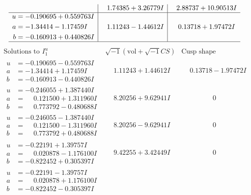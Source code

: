 \documentclass[1p]{elsarticle_modified}
\theoremstyle{definition}
\newcommand{\I}{\sqrt{-1}}
\begin{document}
$$\begin{array}{c|c|c}
 & \phantom{-}1.74385 + 3.26779 I & \phantom{-}2.88737 + 10.90513 I \\ \hline\begin{aligned}
u &= -0.190695 + 0.559763 I \\
a &= -1.34414 - 1.17459 I \\
b &= -0.160913 + 0.440826 I\end{aligned}
 & \phantom{-}1.11243 - 1.44612 I & \phantom{-}0.13718 + 1.97472 I\\
 \hline 
 \end{array}$$\newpage$$\begin{array}{c|c|c}  
\text{Solutions to }I^u_{1}& \I (\text{vol} + \sqrt{-1}CS) & \text{Cusp shape}\\
 \hline 
\begin{aligned}
u &= -0.190695 - 0.559763 I \\
a &= -1.34414 + 1.17459 I \\
b &= -0.160913 - 0.440826 I\end{aligned}
 & \phantom{-}1.11243 + 1.44612 I & \phantom{-}0.13718 - 1.97472 I \\ \hline\begin{aligned}
u &= -0.246055 + 1.387440 I \\
a &= \phantom{-}0.121500 + 1.311960 I \\
b &= \phantom{-}0.773792 - 0.480688 I\end{aligned}
 & \phantom{-}8.20256 + 9.62941 I & \phantom{-0.000000 } 0 \\ \hline\begin{aligned}
u &= -0.246055 - 1.387440 I \\
a &= \phantom{-}0.121500 - 1.311960 I \\
b &= \phantom{-}0.773792 + 0.480688 I\end{aligned}
 & \phantom{-}8.20256 - 9.62941 I & \phantom{-0.000000 } 0 \\ \hline\begin{aligned}
u &= -0.22191 + 1.39757 I \\
a &= \phantom{-}0.020878 - 1.176100 I \\
b &= -0.822452 + 0.305397 I\end{aligned}
 & \phantom{-}9.42255 + 3.42449 I & \phantom{-0.000000 } 0 \\ \hline\begin{aligned}
u &= -0.22191 - 1.39757 I \\
a &= \phantom{-}0.020878 + 1.176100 I \\
b &= -0.822452 - 0.305397 I\end{aligned}

\end{array}$$
\end{document}
